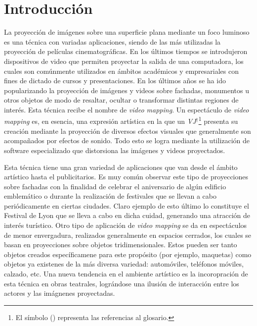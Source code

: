 ﻿\chapter{Introducción}%

La proyección de imágenes sobre una superficie plana mediante un foco luminoso es una técnica con variadas aplicaciones, siendo de las más utilizadas la proyección de películas cinematográficas. En los últimos tiempos se introdujeron dispositivos de video que permiten proyectar la salida de una computadora, los cuales son comúnmente utilizados en ámbitos académicos y empresariales con fines de dictado de cursos y presentaciones. En los últimos años se ha ido popularizando la proyección de imágenes y videos sobre fachadas, monumentos u otros objetos  de modo de resaltar, ocultar o transformar distintas regiones de interés. Esta técnica recibe el nombre de \emph{video mapping}.
Un espectáculo de \emph{video mapping} es, en esencia, una expresión artística en la que un \emph{VJ}$^\dagger$\footnote{El símbolo (\dag) representa las referencias al glosario.} presenta su creación mediante la proyección de diversos efectos visuales que generalmente son acompañados por efectos de sonido. Todo esto se logra mediante la utilización de software especializado que distorsiona las imágenes y videos proyectados.


Esta técnica tiene una gran variedad de aplicaciones que van desde el ámbito artístico hasta el publicitarios. 
Es muy común observar este tipo de proyecciones sobre fachadas con la finalidad de celebrar el aniversario de algún edificio emblemático o durante la realización de festivales que se llevan a cabo periódicamente en ciertas ciudades. Claro ejemplo de esto último lo constituye el Festival de Lyon \cite{FestivalLyon} que se lleva a cabo en dicha cuidad, generando una atracción de interés turístico.
Otro tipo de aplicación de \emph{video mapping} se da en espectáculos de menor envergadura, realizados generalmente en espacios cerrados, los cuales se basan en proyecciones sobre objetos tridimensionales. Estos pueden ser tanto objetos creados específicamene para este propósito (por ejemplo, maquetas) como objetos ya existenes de la más diversa variedad: automóviles, teléfonos móviles, calzado, etc. Una nueva tendencia en el ambiente artístico es la incoropración de esta técnica en obras teatrales, lográndose una ilusión de interacción entre los actores y las imágnenes proyectadas.

